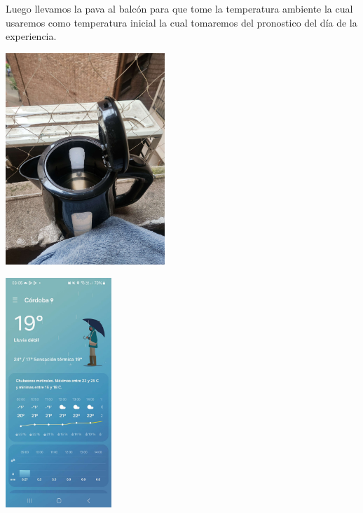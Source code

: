 \documentclass[]{article}
\begin{document}
\begin{center}
	Luego llevamos la pava al balcón para que tome la temperatura ambiente la cual usaremos como temperatura inicial la cual tomaremos del pronostico del día de la experiencia.
\end{center}
\begin{center}
	\includegraphics[width=6cm]{pava4.jpg}
\end{center}
\begin{center}
	\includegraphics[width=4cm]{pava5.jpg}
\end{center}

\newpage
\end{document}
